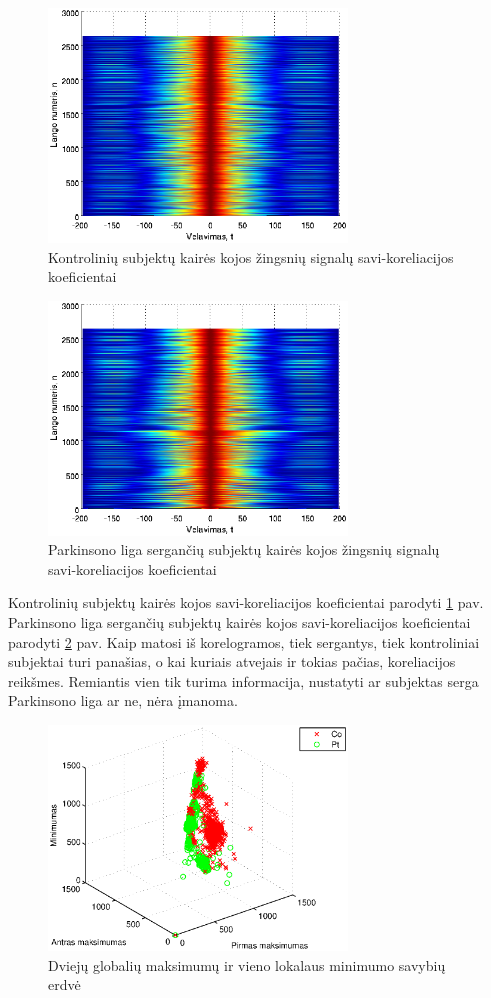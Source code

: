 \documentclass[]{vgtuef}
\begin{document}
\begin{figure}[!t]
  \centering
  \includegraphics[width=300px]{figures/co_corr.eps}
  \caption{Kontrolinių subjektų kairės kojos žingsnių signalų savi-koreliacijos koeficientai}
  \label{fig:co_corr}
\end{figure}

\begin{figure}[!t]
  \centering
  \includegraphics[width=300px]{figures/pt_corr.eps}
  \caption{Parkinsono liga sergančių subjektų kairės kojos žingsnių signalų savi-koreliacijos koeficientai}
  \label{fig:pt_corr}
\end{figure}

Kontrolinių subjektų kairės kojos savi-koreliacijos koeficientai parodyti \ref{fig:co_corr} pav. Parkinsono liga sergančių subjektų kairės kojos savi-koreliacijos koeficientai parodyti \ref{fig:pt_corr} pav. Kaip matosi iš korelogramos, tiek sergantys, tiek kontroliniai subjektai turi panašias, o kai kuriais atvejais ir tokias pačias, koreliacijos reikšmes. Remiantis vien tik turima informacija, nustatyti ar subjektas serga Parkinsono liga ar ne, nėra įmanoma.

\begin{figure}[!t]
  \centering
  \includegraphics[width=300px]{figures/maximums_minimums.eps}
  \caption{Dviejų globalių maksimumų ir vieno lokalaus minimumo savybių erdvė}
  \label{fig:max_min}
\end{figure}
\end{document}
